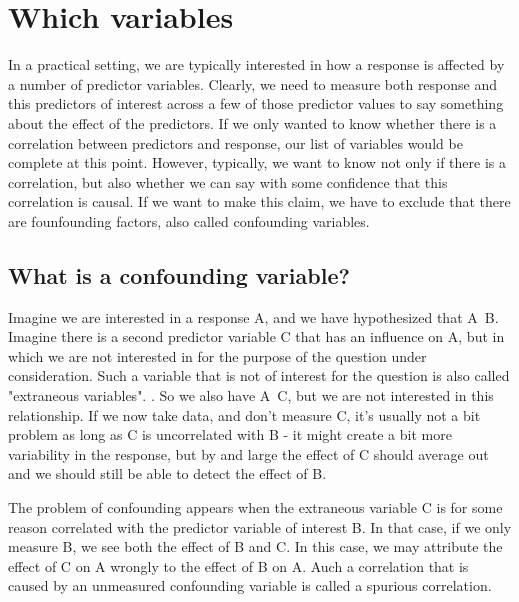 \documentclass[a4paper,twoside]{tufte-book} %
\begin{document}
\section{Which variables}

In a practical setting, we are typically interested in how a response is affected by a number of predictor variables. Clearly, we need to measure both response and this predictors of interest across a few of those predictor values to say something about the effect of the predictors.  If we only wanted to know whether there is a correlation between predictors and response, our list of variables would be complete at this point. However, typically, we want to know not only if there is a correlation, but also whether we can say with some confidence that this correlation is causal. If we want to make this claim, we have to exclude that there are founfounding factors, also called confounding variables. 

\subsection{What is a confounding variable?}

Imagine we are interested in a response A, and we have hypothesized that A~B. Imagine there is a second predictor variable C that has an influence on A, but in which we are not interested in for the purpose of the question under consideration. Such a variable that is not of interest for the question is also called "extraneous variables". . So we also have A~C, but we are not interested in this relationship. If we now take data, and don't measure C, it's usually not a bit problem as long as C is uncorrelated with B - it might create a bit more variability in the response, but by and large the effect of C should average out and we should still be able to detect the effect of B.

The problem of confounding appears when the extraneous variable C is for some reason correlated with the predictor variable of interest B.  In that case, if we only measure B, we see both the effect of B and C. In this case, we may attribute the effect of C on A wrongly to the effect of B on A.  Auch a correlation that is caused by an unmeasured confounding variable is called a spurious correlation.  
\end{document}
